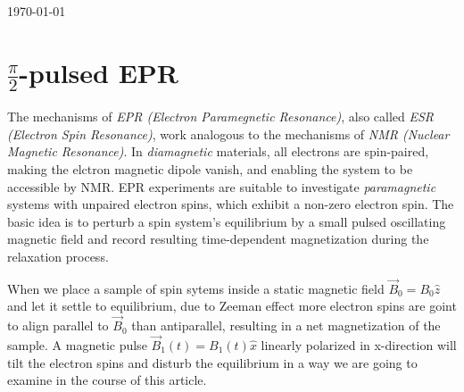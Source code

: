 \documentclass[11.5pt,a4paper]{article}
\begin{document}
\vspace{1cm}


\tableofcontents

\vfill
\hfill \today 


\newpage

\section{$\tfrac{\pi}{2}$-pulsed EPR}
The mechanisms of \emph{EPR (Electron Paramegnetic Resonance)}, also called \emph{ESR (Electron Spin Resonance)}, work analogous to the mechanisms of \emph{NMR (Nuclear Magnetic Resonance)}. In \emph{diamagnetic} materials, all electrons are spin-paired, making the elctron magnetic dipole vanish, and enabling the system to be accessible by NMR. 
EPR experiments are suitable to investigate \emph{paramagnetic} systems with unpaired electron spins, which exhibit a non-zero electron spin. The basic idea is to perturb a spin system's equilibrium by a small pulsed oscillating magnetic field and record resulting time-dependent magnetization during the relaxation process. 

When we place a sample of spin sytems inside a static magnetic field $\vec{B}_0 = B_0 \hat{z}$ and let it settle to equilibrium, due to Zeeman effect more electron spins are goint to align parallel to $\vec{B}_0$ than antiparallel, resulting in a net magnetization of the sample. A magnetic pulse $\vec{B}_1(t) = B_1(t) \hat{x}$ linearly polarized in x-direction will tilt the electron spins and disturb the equilibrium in a way we are going to examine in the course of this article.
\end{document}
